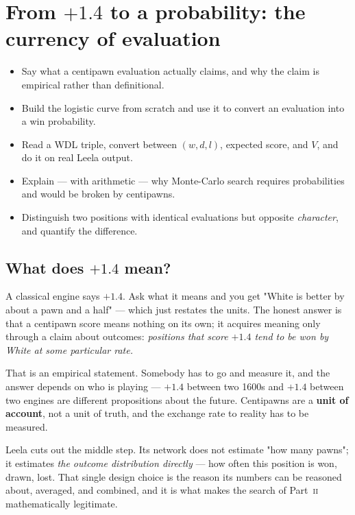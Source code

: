\chapter{From \texorpdfstring{$+1.4$}{+1.4} to a probability: the currency of evaluation}
\label{ch:currency}

\begin{objectives}
\begin{itemize}
\item Say what a centipawn evaluation actually claims, and why the claim is empirical rather
  than definitional.
\item Build the logistic curve from scratch and use it to convert an evaluation into a
  win probability.
\item Read a WDL triple, convert between $(w,d,l)$, expected score, and $V$, and do it on
  real Leela output.
\item Explain --- with arithmetic --- why Monte-Carlo search requires probabilities and
  would be broken by centipawns.
\item Distinguish two positions with identical evaluations but opposite \emph{character},
  and quantify the difference.
\end{itemize}
\end{objectives}

\section{What does $+1.4$ mean?}

A classical engine says $+1.4$. Ask what it means and you get "White is better by about a
pawn and a half" --- which just restates the units. The honest answer is that a centipawn
score means nothing on its own; it acquires meaning only through a claim about outcomes:
\emph{positions that score $+1.4$ tend to be won by White at some particular rate.}

That is an empirical statement. Somebody has to go and measure it, and the answer depends on
who is playing --- $+1.4$ between two 1600s and $+1.4$ between two engines are different
propositions about the future. Centipawns are a \textbf{unit of account}, not a unit of
truth, and the exchange rate to reality has to be measured.

Leela cuts out the middle step. Its network does not estimate "how many pawns"; it estimates
\emph{the outcome distribution directly} --- how often this position is won, drawn, lost.
That single design choice is the reason its numbers can be reasoned about, averaged, and
combined, and it is what makes the search of Part~\textsc{ii} mathematically legitimate.


